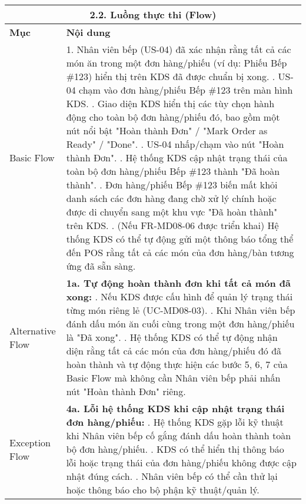 \begin{longtable}{|m{4cm}|p{11cm}|}
\multicolumn{2}{|c|}{\textbf{2.2. Luồng thực thi (Flow)}} \\
\hline
\textbf{Mục} & \textbf{Nội dung} \\
\hline
Basic Flow & 1. Nhân viên bếp (US-04) đã xác nhận rằng tất cả các món ăn trong một đơn hàng/phiếu (ví dụ: Phiếu Bếp \#123) hiển thị trên KDS đã được chuẩn bị xong. \newline 2. US-04 chạm vào đơn hàng/phiếu Bếp \#123 trên màn hình KDS. \newline 3. Giao diện KDS hiển thị các tùy chọn hành động cho toàn bộ đơn hàng/phiếu đó, bao gồm một nút nổi bật "Hoàn thành Đơn" / "Mark Order as Ready" / "Done". \newline 4. US-04 nhấp/chạm vào nút "Hoàn thành Đơn". \newline 5. Hệ thống KDS cập nhật trạng thái của toàn bộ đơn hàng/phiếu Bếp \#123 thành "Đã hoàn thành". \newline 6. Đơn hàng/phiếu Bếp \#123 biến mất khỏi danh sách các đơn hàng đang chờ xử lý chính hoặc được di chuyển sang một khu vực "Đã hoàn thành" trên KDS. \newline 7. (Nếu FR-MD08-06 được triển khai) Hệ thống KDS có thể tự động gửi một thông báo tổng thể đến POS rằng tất cả các món của đơn hàng/bàn tương ứng đã sẵn sàng. \\
\hline
Alternative Flow & \textbf{1a. Tự động hoàn thành đơn khi tất cả món đã xong:} \newline    1. Nếu KDS được cấu hình để quản lý trạng thái từng món riêng lẻ (UC-MD08-03). \newline    2. Khi Nhân viên bếp đánh dấu món ăn cuối cùng trong một đơn hàng/phiếu là "Đã xong". \newline    3. Hệ thống KDS có thể tự động nhận diện rằng tất cả các món của đơn hàng/phiếu đó đã hoàn thành và tự động thực hiện các bước 5, 6, 7 của Basic Flow mà không cần Nhân viên bếp phải nhấn nút "Hoàn thành Đơn" riêng. \\
\hline
Exception Flow & \textbf{4a. Lỗi hệ thống KDS khi cập nhật trạng thái đơn hàng/phiếu:} \newline    1. Hệ thống KDS gặp lỗi kỹ thuật khi Nhân viên bếp cố gắng đánh dấu hoàn thành toàn bộ đơn hàng/phiếu. \newline    2. KDS có thể hiển thị thông báo lỗi hoặc trạng thái của đơn hàng/phiếu không được cập nhật đúng cách. \newline    3. Nhân viên bếp có thể cần thử lại hoặc thông báo cho bộ phận kỹ thuật/quản lý. \\

\end{longtable}
